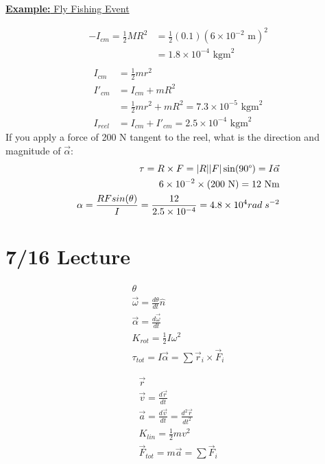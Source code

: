 \documentclass[a4paper]{article}
\let\bf\textbf
\begin{document}
\begin{shaded}
    \underline{\bf{Example:} Fly Fishing Event}
    \vspace{2mm}\\
    \begin{align*}
        -I_{cm} = \frac{1}{2}MR^2 &= \frac{1}{2}(0.1)(6\times 10^{-2}\text{ m})^2\\
        &= 1.8\times 10^{-4}\text{ kgm}^2\\
    \end{align*}
    \begin{align*}
        I_{cm} &= \frac{1}{2}mr^2\\
        I'_{cm} &= I_{cm} + mR^2\\
        &= \frac{1}{2}mr^2 + mR^2 = 7.3 \times 10^{-5}\text{ kgm}^2 \\
        I_{reel} &= I_{cm} + I'_{cm} = 2.5\times 10^{-4}\text{ kgm}^2
    \end{align*}
    If you apply a force of 200 N tangent to the reel, what is the direction and magnitude of $\vec{\alpha}$:
    \begin{align*}
        \tau = R \times F = |R||F|\sin(90\degree) = I\vec{\alpha}\\
        6\times 10^{-2} \times (200\text{ N}) = 12\text{ Nm}\\
        \alpha = \frac{RFsin(\theta)}{I} = \frac{12}{2.5 \times 10^{-4}} = 4.8 \times 10^{4} rad\;s^{-2}
    \end{align*}
\end{shaded}

\section{7/16 Lecture}
\begin{minipage}{0.45\textwidth}
    \begin{align*}
        \theta\\
        \vec{\omega} = \frac{d\theta}{dt}\hat{n}\\
        \vec{\alpha} = \frac{d\vec{\omega}}{dt}\\
        K_{rot} = \frac{1}{2}I\omega^2\\
        \tau_{tot} = I\vec{\alpha} = \sum \vec{r}_i \times \vec{F}_i
    \end{align*}
\end{minipage}
\begin{minipage}{0.45\textwidth}
    \begin{align*}
        \vec{r}\\
        \vec{v} = \frac{d\vec{r}}{dt}\\
        \vec{a} = \frac{d\vec{v}}{dt} = \frac{d^2\vec{r}}{dt^2}\\
        K_{lin} = \frac{1}{2}mv^2\\
        \vec{F}_{tot} = m\vec{a} = \sum\vec{F}_i
    \end{align*}
\end{minipage}
\end{document}
